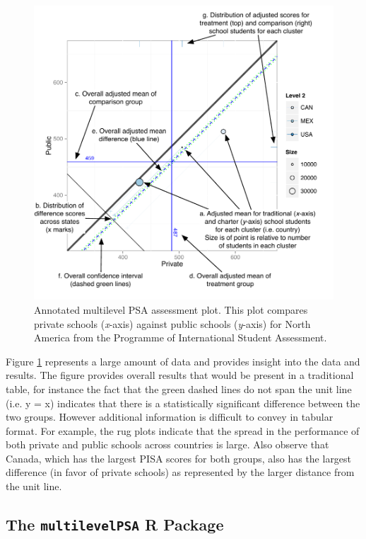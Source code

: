\documentclass[letterpaper,12p,twoside]{article} %
\begin{document}
\begin{figure}[t!]
\begin{center}
\includegraphics[width=.9\textwidth]{../Figures/AnnotatedCircPlot.pdf}
\caption[Annotated multilevel PSA assessment plot]{Annotated multilevel PSA assessment plot. This plot compares private schools (\textit{x}-axis) against public schools (\textit{y}-axis) for North America from the Programme of International Student Assessment.}
\label{fig:g8math:circ}
\end{center}
\end{figure}


Figure \ref{fig:g8math:circ} represents a large amount of data and provides insight into the data and results. The figure provides overall results that would be present in a traditional table, for instance the fact that the green dashed lines do not span the unit line (i.e. y = x) indicates that there is a statistically significant difference between the two groups. However additional information is difficult to convey in tabular format. For example, the rug plots indicate that the spread in the performance of both private and public schools across countries is large. Also observe that Canada, which has the largest PISA scores for both groups, also has the largest difference (in favor of private schools) as represented by the larger distance from the unit line.


\subsection{The \texttt{multilevelPSA} R Package}
\end{document}
